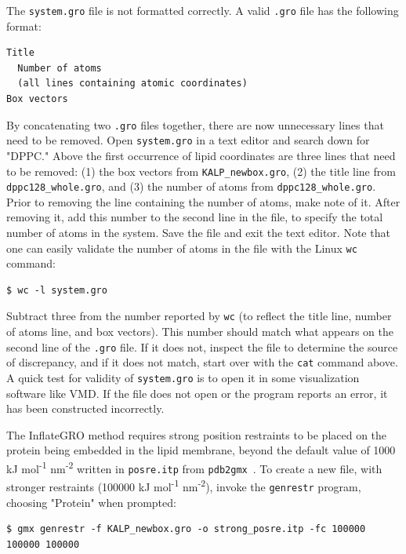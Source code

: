 \documentclass[9pt,tutorial,pubversion]{livecoms}
\begin{document}
The \texttt{system.gro} file is not formatted correctly. A valid \texttt{.gro} file has the following format:

\begin{lstlisting}
Title
  Number of atoms
  (all lines containing atomic coordinates)
Box vectors
\end{lstlisting}

By concatenating two \texttt{.gro} files together, there are now unnecessary lines that need to be removed. Open \texttt{system.gro} in a text editor and search down for "DPPC." Above the first occurrence of lipid coordinates are three lines that need to be removed: (1) the box vectors from \texttt{KALP\_newbox.gro}, (2) the title line from \texttt{dppc128\_whole.gro}, and (3) the number of atoms from \texttt{dppc128\_whole.gro}. Prior to removing the line containing the number of atoms, make note of it. After removing it, add this number to the second line in the file, to specify the total number of atoms in the system. Save the file and exit the text editor. Note that one can easily validate the number of atoms in the file with the Linux \texttt{wc} command:

\begin{lstlisting}
$ wc -l system.gro
\end{lstlisting}
%
Subtract three from the number reported by \texttt{wc} (to reflect the title line, number of atoms line, and box vectors). This number should match what appears on the second line of the \texttt{.gro} file. If it does not, inspect the file to determine the source of discrepancy, and if it does not match, start over with the \texttt{cat} command above. A quick test for validity of \texttt{system.gro} is to open it in some visualization software like VMD. If the file does not open or the program reports an error, it has been constructed incorrectly.

The InflateGRO method requires strong position restraints to be placed on the protein being embedded in the lipid membrane, beyond the default value of 1000 kJ mol\textsuperscript{-1} nm\textsuperscript{-2} written in \texttt{posre.itp} from \texttt{pdb2gmx}~\cite{Kandt2007}. To create a new file, with stronger restraints (100000 kJ mol\textsuperscript{-1} nm\textsuperscript{-2}), invoke the \texttt{genrestr} program, choosing "Protein" when prompted:

\begin{lstlisting}
$ gmx genrestr -f KALP_newbox.gro -o strong_posre.itp -fc 100000 100000 100000
\end{lstlisting}
\end{document}
